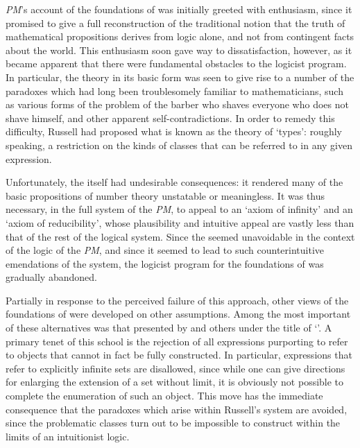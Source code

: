 \textsl{PM}'s account of the foundations of  was initially
greeted with enthusiasm, since it promised to give a full
reconstruction of the traditional notion that the truth of
mathematical propositions derives from logic alone, and not from
contingent facts about the world. This enthusiasm soon gave way to
dissatisfaction, however, as it became apparent that there were
fundamental obstacles to the logicist program. In particular, the
theory in its {basic form} was seen to give rise to a number of the
paradoxes which had long been troublesomely familiar to
mathematicians, such as various forms of the problem of the barber who
shaves everyone who does not shave himself, and other apparent
self-contradictions. In order to remedy this difficulty, Russell had
proposed what is known as the theory of `types': roughly speaking, a
restriction on the kinds of classes that can be referred to in any
given expression.

Unfortunately, the  itself had undesirable
consequences: it rendered many of the basic propositions of number
theory unstatable or meaningless. It was thus necessary, in the full
system of the \textsl{PM}, to appeal to an `axiom of infinity' and an
`axiom of reducibility', whose plausibility and intuitive appeal are
vastly less than that of the rest of the logical system. Since the
 seemed unavoidable in the context of the logic of the
\textsl{PM}, and since it seemed to lead to such counterintuitive
emendations of the system, the logicist program for the foundations of
 was gradually abandoned.

Partially in response to the perceived failure of this approach, other
views of the foundations of  were developed on other
assumptions. Among the most important of these alternatives was that
presented by  and others under the title of
`'. A primary tenet of this school is the rejection of all
expressions purporting to refer to objects that cannot in fact be
fully constructed. In particular, expressions that refer to explicitly
infinite sets are disallowed, since while one can give directions for
enlarging the extension of a set without limit, it is obviously not
possible to complete the enumeration of such an object. This move has
the immediate consequence that the paradoxes which arise within
Russell's system are avoided, since the problematic classes turn out
to be impossible to construct within the limits of an intuitionist
logic.

